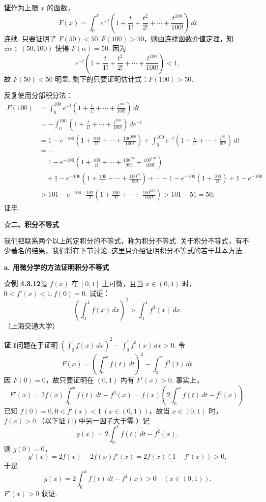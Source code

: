 \documentclass[UTF8, 12pt, fontset=fandol, oneside]{ctexart}
\begin{document}
\noindent\textbf{证}\quad 作为上限 $x$ 的函数，
\[
F(x)=\int_0^x e^{-t}\left(1+\frac{t}{1!}+\frac{t^2}{2!}+\cdots+\frac{t^{100}}{100!}\right)\,dt
\]
连续. 只要证明了 $F(50)<50,F(100)>50$，则由连续函数介值定理，知 $\exists\alpha\in(50,100)$ 使得 $F(\alpha)=50$. 因为
\[
e^{-t}\left(1+\frac{t}{1!}+\frac{t^2}{2!}+\cdots+\frac{t^{100}}{100!}\right)<1,
\]
故 $F(50)<50$ 明显. 剩下的只要证明估计式：$F(100)>50$.

反复使用分部积分法：
\[
\begin{aligned}
F(100)
&=\int_0^{100}e^{-t}\left(1+\frac{t}{1!}+\cdots+\frac{t^{100}}{100!}\right)\,dt\\
&=-\int_0^{100}\left(1+\frac{t}{1!}+\cdots+\frac{t^{100}}{100!}\right)\,de^{-t}\\
&=1-e^{-100}\left(1+\frac{100}{1!}+\cdots+\frac{100^{100}}{100!}\right)
+\int_0^{100}e^{-t}\left(1+\frac{t}{1!}+\cdots+\frac{t^{99}}{99!}\right)\,dt\\
&=\cdots\\
&=1-e^{-100}\left(1+\frac{100}{1!}+\cdots+\frac{100^{99}}{99!}+\frac{100^{100}}{100!}\right)\\
&\quad+1-e^{-100}\left(1+\frac{100}{1!}+\cdots+\frac{100^{99}}{99!}\right)+\cdots
+1-e^{-100}\left(1+\frac{100}{1!}\right)+1-e^{-100}\\
&>101-e^{-100}\cdot\frac{102}{2}
\left(1+\frac{100}{1!}+\cdots+\frac{100^{101}}{101!}\right)>101-51=50.
\end{aligned}
\]
证毕.

\noindent\textbf{☆二、积分不等式}

我们把联系两个以上的定积分的不等式，称为积分不等式. 关于积分不等式，有不少著名的结果，我们将在下节讨论. 这里只介绍证明积分不等式的若干基本方法.

\noindent\textbf{a. 用微分学的方法证明积分不等式}

\noindent\textbf{☆例 4.3.12}\quad 设 $f(x)$ 在 $[0,1]$ 上可微，且当 $x\in(0,1)$ 时，$0<f'(x)<1,f(0)=0$. 试证：
\[
\left(\int_0^1 f(x)\,dx\right)^2>\int_0^1 f^3(x)\,dx.
\]
（上海交通大学）

\noindent\textbf{证 I}\quad 问题在于证明 $\left(\int_0^1 f(x)\,dx\right)^2-\int_0^1 f^3(x)\,dx>0$. 令
\[
F(x)=\left(\int_0^x f(t)\,dt\right)^2-\int_0^x f^3(t)\,dt.
\]
因 $F(0)=0$，故只要证明在 $(0,1)$ 内有 $F'(x)>0$. 事实上，
\[
F'(x)=2f(x)\int_0^x f(t)\,dt-f^3(x)
=f(x)\left(2\int_0^x f(t)\,dt-f^2(x)\right).
\tag{1}
\]
已知 $f(0)=0,0<f'(x)<1\ (x\in(0,1))$，故当 $x\in(0,1)$ 时，$f(x)>0$.（以下证 (1) 中另一因子大于零.）记
\[
g(x)=2\int_0^x f(t)\,dt-f^2(x),
\]
则 $g(0)=0$，
\[
g'(x)=2f(x)-2f(x)f'(x)=2f(x)(1-f'(x))>0,
\]
于是
\[
g(x)=2\int_0^x f(t)\,dt-f^2(x)>0\quad(x\in(0,1)).
\]
$F'(x)>0$ 获证.
\end{document}
